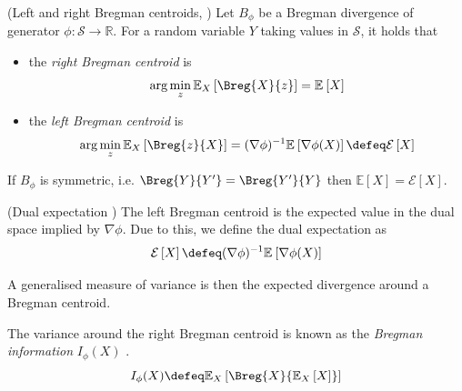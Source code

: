 \documentclass[
    a4paper, %
	fontsize=10pt, %
	twoside=false, %
]{kaobook}
\begin{document}
\begin{lemma} (Left and right Bregman centroids, \cite{pfau_GeneralizedBiasVarianceDecomposition_})
  \label{thm:bregman-centroids}
    Let $B_{\phi}$ be a Bregman divergence of generator $\phi: \mathcal{S} \to \mathbb{R}$. For a random variable $Y$ taking values in $\mathcal{S}$, it holds that
\begin{itemize}
    \item the \textit{right Bregman centroid} is $$\arg \min_z \mathbb{E}_{X}\left[ \Breg{X}{z}  \right] = \mathbb{E}_{}\left[ X \right]$$
    \item the \textit{left Bregman centroid} is $$\arg\min_{z}  \mathbb{E}_{X}\left[ \Breg{z}{X}\right] = (\nabla \phi)^{-1} \mathbb{E}_{}\left[ \nabla \phi(X) \right] \defeq \mathcal{E}\left[X\right]$$
\end{itemize}
  If $B_\phi$ is symmetric, i.e. $\Breg{Y}{Y'} = \Breg{Y'}{Y}$ then $\mathbb{E}\left[X\right] = \mathcal{E}\left[X\right]$.
\end{lemma}
\begin{definition} (Dual expectation \cite{pfau})
  The left Bregman centroid is the expected value in the dual space implied by $\nabla\phi$. Due to this, we define the dual expectation as  
  $$\mathcal{E}\left[X\right] \defeq (\nabla \phi)^{-1}\mathbb{E}_{}\left[ \nabla \phi(X) \right]$$ 
\end{definition}


A generalised measure of variance is then the expected divergence around a Bregman centroid.

\begin{definition}
	\label{def:bregman-information}
	The variance around the right Bregman centroid is known as the 
	\textit{Bregman information} 
  $I_{\phi}(X)$
  \cite{banerjee_ClusteringBregmanDivergences_2004}.
$$
I_{\phi}(X) \defeq \mathbb{E}_{X}\left[ \Breg{X}{\mathbb{E}_X\left[ X \right] } \right] 
$$
\end{definition}
\end{document}
